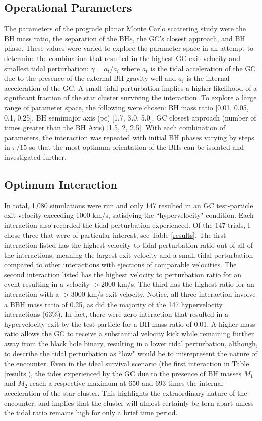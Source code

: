 \documentclass{aastex62}
\begin{document}
\subsection{Operational Parameters}
The parameters of the prograde planar Monte Carlo scattering study were the BH mass ratio, the separation of the BHs, the GC's closest approach, and BH phase. These values were varied to explore the parameter space in an attempt to determine the combination that resulted in the highest GC exit velocity and smallest tidal perturbation: $\gamma = {a_{t}}/{a_i}$ where $a_{t}$ is the tidal acceleration of the GC due to the presence of the external BH gravity well and $a_{i}$ is the internal acceleration of the GC. A small tidal perturbation implies a higher likelihood of a significant fraction of the star cluster surviving the interaction. To explore a large range of parameter space, the following were chosen: BH mass ratio [0.01, 0.05, 0.1, 0.25], BH semimajor axis (pc) [1.7, 3.0, 5.0], GC closest approach (number of times greater than the BH Axis) [1.5, 2, 2.5]. With each combination of parameters, the interaction was repeated with initial BH phases varying by steps in $\pi/15$ so that the most optimum orientation of the BHs can be isolated and investigated further. 

\subsection{Optimum Interaction}
In total, 1,080 simulations were run and only 147 resulted in an GC test-particle exit velocity exceeding 1000 km/s, satisfying the ``hypervelocity" condition. Each interaction also recorded the tidal perturbation experienced. Of the 147 trials, I chose three that were of particular interest, see Table \ref{results}. The first interaction listed has the highest velocity to tidal perturbation ratio out of all of the interactions, meaning the largest exit velocity and a small tidal perturbation compared to other interactions with ejections of comparable velocities. The second interaction listed has the highest velocity to perturbation ratio for an event resulting in a velocity $>$2000 km/s. The third has the highest ratio for an interaction with a $>$3000 km/s exit velocity. Notice, all three interaction involve a BBH mass ratio of 0.25, as did the majority of the 147 hypervelocity interactions (63$\%$). In fact, there were zero interaction that resulted in a hypervelocity exit by the test particle for a BH mass ratio of 0.01. A higher mass ratio allows the GC to receive a substantial velocity kick while remaining further away from the black hole binary, resulting in a lower tidal perturbation, although, to describe the tidal perturbation as ``low" would be to misrepresent the nature of the encounter. Even in the ideal survival scenario (the first interaction in Table \ref{results}), the tides experienced by the GC due to the presence of BH masses $M_{1}$ and $M_{2}$ reach a respective maximum at 650 and 693 times the internal acceleration of the star cluster. This highlights the extraordinary nature of the encounter, and implies that the cluster will almost certainly be torn apart unless the tidal ratio remains high for only a brief time period. 
\end{document}
